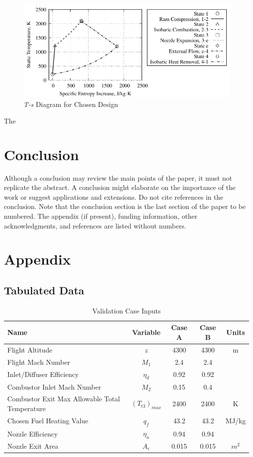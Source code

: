 \documentclass[conf]{new-aiaa} %
\begin{document}
\begin{figure}[H] %
    \centering
    \includegraphics[]{media/ts_plot_files/TS_plot_for_design.pdf}
    \caption{\label{fig:partits}\texorpdfstring{\textit{T-s}}{Ts} Diagram for Chosen Design}
\end{figure}
The


\section{Conclusion}
Although a conclusion may review the main points of the paper, it must not replicate the abstract. A conclusion might elaborate on the importance of the work or suggest applications and extensions. Do not cite references in the conclusion. Note that the conclusion section is the last section of the paper to be numbered. The appendix (if present), funding information, other acknowledgments, and references are listed without numbers.


\section*{Appendix}
\subsection{Tabulated Data}
\begin{table}[H] %
    \caption{\label{tab:val_case_input}Validation Case Inputs}
    \centering
    \begin{tabular}{lcccc}
        \hline
        Name& Variable& Case A& Case B& Units\\\hline
        Flight Altitude& $z$& 4300& 4300& m\\
        Flight Mach Number& $M_1$& 2.4& 2.4\\
        Inlet/Diffuser Efficiency& $\eta_d$& 0.92& 0.92\\
        Combustor Inlet Mach Number& $M_2$& 0.15& 0.4\\
        Combustor Exit Max Allowable Total Temperature& $(T_{t3})_{max}$& 2400& 2400& K\\
        Chosen Fuel Heating Value& $q_f$& 43.2& 43.2& MJ/kg\\
        Nozzle Efficiency& $\eta_n$& 0.94& 0.94\\
        Nozzle Exit Area& $A_e$& 0.015& 0.015& $m^2$\\
        \hline
    \end{tabular}
\end{table}
\end{document}
